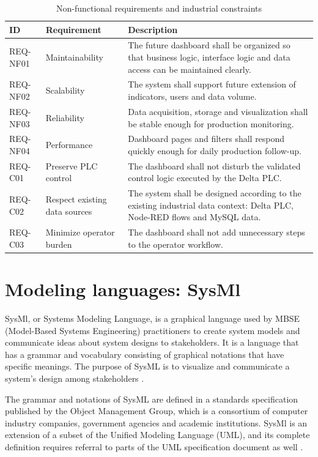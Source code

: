 \begin{table}[H]
\centering
\caption{Non-functional requirements and industrial constraints}
\begin{tabular}{|l|l|p{5.5cm}|}
\hline
\textbf{ID} & \textbf{Requirement} & \textbf{Description} \\
\hline
REQ-NF01 & Maintainability & The future dashboard shall be organized so that business logic, interface logic and data access can be maintained clearly. \\
\hline
REQ-NF02 & Scalability & The system shall support future extension of indicators, users and data volume. \\
\hline
REQ-NF03 & Reliability & Data acquisition, storage and visualization shall be stable enough for production monitoring. \\
\hline
REQ-NF04 & Performance & Dashboard pages and filters shall respond quickly enough for daily production follow-up. \\
\hline
REQ-C01 & Preserve PLC control & The dashboard shall not disturb the validated control logic executed by the Delta PLC. \\
\hline
REQ-C02 & Respect existing data sources & The system shall be designed according to the existing industrial data context: Delta PLC, Node-RED flows and MySQL data. \\
\hline
REQ-C03 & Minimize operator burden & The dashboard shall not add unnecessary steps to the operator workflow. \\
\hline
\end{tabular}
\label{tab:chapter1-2}
\end{table}

\section{\fontsize{15}{18}\selectfont Modeling languages: SysMl}

SysMl, or Systems Modeling Language, is a graphical language used by MBSE (Model-Based Systems Engineering) practitioners to create system models and communicate ideas about system designs to stakeholders. It is a language that has a grammar and vocabulary consisting of graphical notations that have specific meanings. The purpose of SysML is to visualize and communicate a system's design among stakeholders \cite{sysml_modeling}.

The grammar and notations of SysML are defined in a standards specification published by the Object Management Group, which is a consortium of computer industry companies, government agencies and academic institutions. SysMl is an extension of a subset of the Unified Modeling Language (UML), and its complete definition requires referral to parts of the UML specification document as well \cite{sysml_modeling}.

